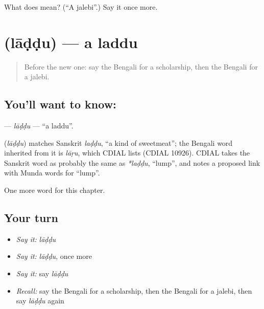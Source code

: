 \begin{tcolorbox}[breakable,colback=teal!4,colframe=teal!35!black,title={Before you move on}]
What does  mean? (\textquotedblleft{}A jalebi\textquotedblright{}.) Say it once more.
\end{tcolorbox}
\section[\texorpdfstring{\bn{লাড্ডু} (lāḍḍu)}{লাড্ডু (lāḍḍu)}]{ (lāḍḍu) — a laddu}

\label{lesson:BN-C173-laddu}



\begin{quote}
Before the new one: say the Bengali for a scholarship, then the Bengali for a jalebi.
\end{quote}

\subsection*{You'll want to know: }
\textbf{} — \emph{lāḍḍu} — \textquotedblleft{}a laddu\textquotedblright{}.

\begin{cousinweb}
\textbf{} (\emph{lāḍḍu}) matches Sanskrit \emph{laḍḍu}, \textquotedblleft{}a kind of sweetmeat\textquotedblright{}; the Bengali word inherited from it is \emph{lāṛu}, which CDIAL lists (CDIAL 10926). CDIAL takes the Sanskrit word as probably the same as \emph{*laḍḍu}, \textquotedblleft{}lump\textquotedblright{}, and notes a proposed link with Munda words for \textquotedblleft{}lump\textquotedblright{}.
\end{cousinweb}

\begin{grammarlens}[title={What you've built}]
One more word for this chapter.
\end{grammarlens}

\subsection*{Your turn}
\begin{itemize}
\raggedright
  \item \emph{Say it:} \emph{lāḍḍu}
  \item \emph{Say it:} \emph{lāḍḍu}, once more
  \item \emph{Say it:} say \emph{lāḍḍu}
  \item \emph{Recall:} say the Bengali for a scholarship, then the Bengali for a jalebi, then say \emph{lāḍḍu} again
\end{itemize}


